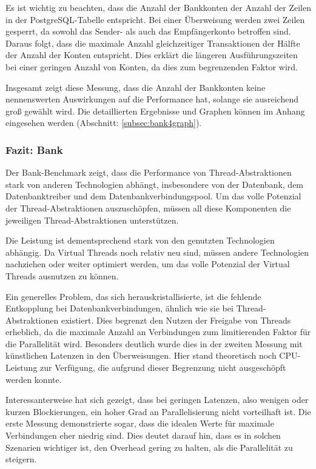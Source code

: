 \documentclass[fontsize=12pt,paper=a4,twoside=semi,parskip=half-,headsepline,headinclude]{scrreprt}
\begin{document}
Es ist wichtig zu beachten, dass die Anzahl der Bankkonten der Anzahl der Zeilen in der PostgreSQL-Tabelle entspricht. Bei einer Überweisung werden zwei Zeilen gesperrt, da sowohl das Sender- als auch das Empfängerkonto betroffen sind. Daraus folgt, dass die maximale Anzahl gleichzeitiger Transaktionen der Hälfte der Anzahl der Konten entspricht. Dies erklärt die längeren Ausführungszeiten bei einer geringen Anzahl von Konten, da dies zum begrenzenden Faktor wird.

Insgesamt zeigt diese Messung, dass die Anzahl der Bankkonten keine nennenswerten Auswirkungen auf die Performance hat, solange sie ausreichend groß gewählt wird. Die detaillierten Ergebnisse und Graphen können im Anhang eingesehen werden (Abschnitt: \ref{subsec:bank4graph}).

\subsubsection{Fazit: Bank}

Der Bank-Benchmark zeigt, dass die Performance von Thread-Abstraktionen stark von anderen Technologien abhängt, insbesondere von der Datenbank, dem Datenbanktreiber und dem Datenbankverbindungspool. Um das volle Potenzial der Thread-Abstraktionen auszuschöpfen, müssen all diese Komponenten die jeweiligen Thread-Abstraktionen unterstützen.

Die Leistung ist dementsprechend stark von den genutzten Technologien abhängig. Da Virtual Threads noch relativ neu sind, müssen andere Technologien nachziehen oder weiter optimiert werden, um das volle Potenzial der Virtual Threads ausnutzen zu können.

Ein generelles Problem, das sich herauskristallisierte, ist die fehlende Entkopplung bei Datenbankverbindungen, ähnlich wie sie bei Thread-Abstraktionen existiert. Dies begrenzt den Nutzen der Freigabe von Threads erheblich, da die maximale Anzahl an Verbindungen zum limitierenden Faktor für die Parallelität wird. Besonders deutlich wurde dies in der zweiten Messung mit künstlichen Latenzen in den Überweisungen. Hier stand theoretisch noch CPU-Leistung zur Verfügung, die aufgrund dieser Begrenzung nicht ausgeschöpft werden konnte.

Interessanterweise hat sich gezeigt, dass bei geringen Latenzen, also wenigen oder kurzen Blockierungen, ein hoher Grad an Parallelisierung nicht vorteilhaft ist. Die erste Messung demonstrierte sogar, dass die idealen Werte für maximale Verbindungen eher niedrig sind. Dies deutet darauf hin, dass es in solchen Szenarien wichtiger ist, den Overhead gering zu halten, als die Parallelität zu steigern.
\end{document}
